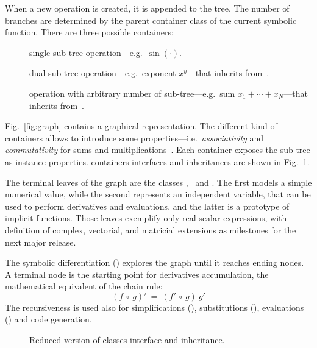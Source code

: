 When a new operation is created, it is appended to the tree. The number of branches are determined by the parent container class of the current symbolic function. There are three possible containers:
\begin{description}
  \item[\CASOp] single sub-tree operation---e.g.~$\sin(\cdot)$.
  \item[\CASBinaryOp] dual sub-tree operation---e.g.~exponent $x^y$---that inherits from~\CASOp.
  \item[\CASNaryOp] operation with arbitrary number of sub-tree---e.g.~sum $x_1 + \cdots + x_N$---that inherits from~\CASOp.
\end{description}
Fig.~\ref{fig:graph} contains a graphical representation. The different kind of containers allows to introduce some properties---i.e.~\emph{associativity} and \emph{commutativity} for sums and multiplications~\cite{cohen2003computer}. Each container exposes the sub-tree as instance properties.  containers interfaces and inheritances are shown in Fig.~\ref{fig:uml-container}. 

The terminal leaves of the graph are the classes \CASConstant, \CASVariable~and \CASFunction. The first models a simple numerical value, while the second represents an independent variable, that can be used to perform derivatives and evaluations, and the latter is a prototype of implicit functions. Those leaves exemplify only real scalar expressions, with definition of complex, vectorial, and matricial extensions as milestones for the next major release.

The symbolic differentiation (\CASOpdiff) explores the graph until it reaches ending nodes. A terminal node is the starting point for derivatives accumulation, the mathematical equivalent of the chain rule:
\begin{equation}
\left( f  \, \circ \, g \right)' \: = \:
\left( f' \, \circ \, g \right) \: g'
\end{equation}
The recursiveness is used also for simplifications (\CASOpsimplify), substitutions (\CASOpsubs), evaluations (\CASOpcall) and code generation.

\begin{figure}[ht!]
\centering

\caption{\label{fig:uml-container}Reduced version of classes interface and inheritance. }
\end{figure}

